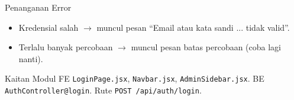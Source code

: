 \begin{flowsection}{Penanganan Error}
\begin{itemize}
  \item Kredensial salah $\rightarrow$ muncul pesan ``Email atau kata sandi ... tidak valid''.
  \item Terlalu banyak percobaan $\rightarrow$ muncul pesan batas percobaan (coba lagi nanti).
\end{itemize}
\end{flowsection}

\begin{flowsection}{Kaitan Modul}
FE \texttt{LoginPage.jsx}, \texttt{Navbar.jsx}, \texttt{AdminSidebar.jsx}. BE
\texttt{AuthController@login}. Rute \texttt{POST /api/auth/login}.
\end{flowsection}

